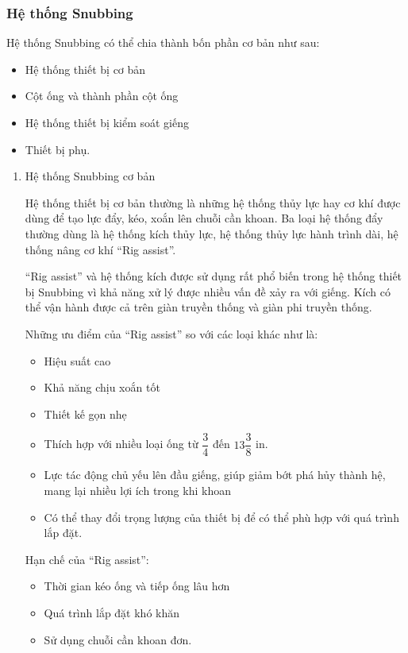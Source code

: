 \documentclass[13pt,a4paper]{article}
\begin{document}
	\subsubsection{Hệ thống Snubbing}
	Hệ thống Snubbing có thể chia thành bốn phần cơ bản như sau:
	\begin{itemize}
		\item Hệ thống thiết bị cơ bản
		\item Cột ống và thành phần cột ống
		\item Hệ thống thiết bị kiểm soát giếng
		\item Thiết bị phụ.
	\end{itemize}
	\begin{enumerate}
		\item Hệ thống Snubbing cơ bản\par
		Hệ thống thiết bị cơ bản thường là những hệ thống thủy lực hay cơ khí được dùng để tạo lực đẩy, kéo, xoắn lên chuỗi cần khoan. Ba loại hệ thống đẩy thường dùng là hệ thống kích thủy lực, hệ thống thủy lực hành trình dài, hệ thống nâng cơ khí ``Rig assist''.\par
		``Rig assist'' và hệ thống kích được sử dụng rất phổ biến trong hệ thống thiết bị Snubbing vì khả năng xử lý được nhiều vấn đề xảy ra với giếng. Kích có thể vận hành được cả trên giàn truyền thống và giàn phi truyền thống.\par
		Những ưu điểm của ``Rig assist'' so với các loại khác như là:
		\begin{itemize}
			\item Hiệu suất cao
			\item Khả năng chịu xoắn tốt
			\item Thiết kế gọn nhẹ
			\item Thích hợp với nhiều loại ống từ $\dfrac{3}{4}$ đến $13\dfrac{3}{8}$ in.
			\item Lực tác động chủ yếu lên đầu giếng, giúp giảm bớt phá hủy thành hệ, mang lại nhiều lợi ích trong khi khoan
			\item Có thể thay đổi trọng lượng của thiết bị để có thể phù hợp với quá trình lắp đặt.
		\end{itemize}
		Hạn chế của ``Rig assist'':
		\begin{itemize}
			\item Thời gian kéo ống và tiếp ống lâu hơn
			\item Quá trình lắp đặt khó khăn
			\item Sử dụng chuỗi cần khoan đơn.
		\end{itemize}
		\begin{figure}[h]

\end{figure}
\end{enumerate}
\end{document}
